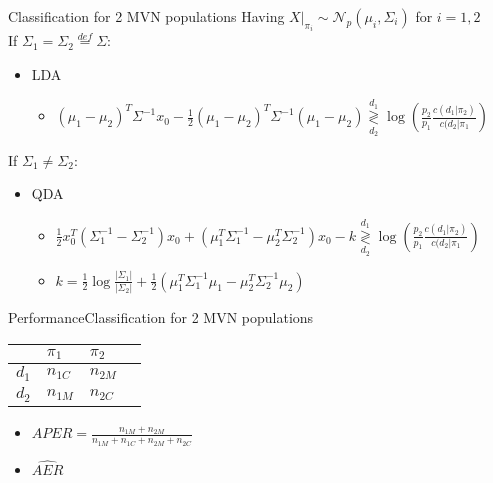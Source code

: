\documentclass[aspectratio=169,10pt,t]{beamer}
\newcommand\gldec[2]{
	\underset{#2}{\overset{#1}{\gtrless}}
}
\begin{document}
\begin{frame}{Classification for 2 MVN populations}
    Having $X|_{\pi_i} \sim \mathcal{N}_p(\mu_i, \Sigma_i)$ for $i = 1, 2$ \\
    If $\Sigma_1 = \Sigma_2 \overset{def}{=} \Sigma$:
		\pause
    \begin{itemize}
        \item LDA
        \begin{itemize}
            \item $(\mu_1 - \mu_2)^T \Sigma^{-1}x_0 - \frac{1}{2}(\mu_1 - \mu_2)^T \Sigma^{-1}(\mu_1 - \mu_2)  \gldec{d_1}{d_2} \log(\frac{p_2}{p_1} \frac{c(d_1 | \pi_2)}{c(d_2 | \pi_1})$
        \end{itemize}
    \end{itemize}
		\pause
    If $\Sigma_1 \neq \Sigma_2$:
    \begin{itemize}
        \item QDA
        \begin{itemize}
            \item $
							\frac{1}{2} x_0^T(\Sigma_1^{-1} - \Sigma_2^{-1})x_0 + 
							\left( \mu_1^{T} \Sigma^{-1}_{1} - \mu_2^{T} \Sigma^{-1}_{2}  \right) x_0 -k
							\gldec{d_1}{d_2}
							\log(\frac{p_2}{p_1} \frac{c(d_1 | \pi_2)}{c(d_2 | \pi_1})
							$
						\item $
							k = \frac{1}{2}  \log \frac{| \Sigma_1 |}{| \Sigma_2 |} +
							\frac{1}{2}  \left( 
								\mu_1^{T}\Sigma_1^{-1}\mu_1
								-
								\mu_2^{T}\Sigma_2^{-1}\mu_2
								 \right) 
							$
        \end{itemize}
    \end{itemize}
\end{frame}

\begin{frame}{Performance}{Classification for 2 MVN populations}

        \begin{table}[h]
        \begin{tabular}{@{}llll@{}}
        \toprule
              & $\pi_1$          & $\pi_2$          \\ \midrule
        $d_1$ & $n_{1C}$ & $n_{2M}$ \\
        $d_2$ & $n_{1M}$ & $n_{2C}$ \\ \midrule 
        \end{tabular}
        \end{table}
				\pause
    \begin{itemize}
        \item $APER = \frac{n_{1M} + n_{2M}}{n_{1M} + n_{1C} + n_{2M} + n_{2C}}$
    \end{itemize}
    \begin{itemize}
        \item $\hat{AER}$ 
    \end{itemize}
\end{frame}
\end{document}

